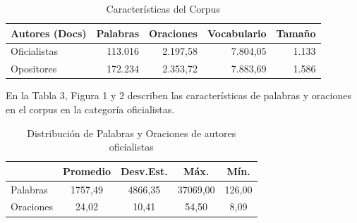 \documentclass[a4paper,10pt]{article}
\begin{document}
 \begin{table}[htbp]
 	\centering
 	 	\begin{tabular}{lrrrr}
 		\multicolumn{1}{c}{Autores (Docs)} & \multicolumn{1}{c}{Palabras} & \multicolumn{1}{c}{Oraciones} & \multicolumn{1}{c}{Vocabulario} & \multicolumn{1}{c}{Tamaño } \\
 		\midrule
 		Oficialistas & 113.016   &   2.197,58    &   7.804,05    & 1.133 \\
 		Opositores &  172.234     &    2.353,72   & 7.883,69      & 1.586 \\
 		\bottomrule
 	\end{tabular}%
 	\label{tab:tabla2}%
\caption{Características del Corpus}
 \end{table}%

 En la Tabla 3, Figura 1 y 2 describen las características de palabras y oraciones en el corpus en la categoría oficialistas. 
 
 \begin{table}[htbp]
 	\centering
 	\begin{tabular}{lcccc}
	\cmidrule{2-5}  
	  \multicolumn{1}{r}{} & \multicolumn{1}{l}{Promedio} & \multicolumn{1}{l}{Desv.Est.} & Máx.   & Mín. \\
	\midrule
		Palabras & 1757,49 & 4866,35 & 37069,00 & 126,00 \\
		Oraciones &  24,02& 10,41 & 54,50 & 8,09 \\
		\bottomrule
	\end{tabular}%
	\caption{\label{tab:tabla3} Distribución de Palabras y Oraciones de autores oficialistas}%
\end{table}

\end{document}
